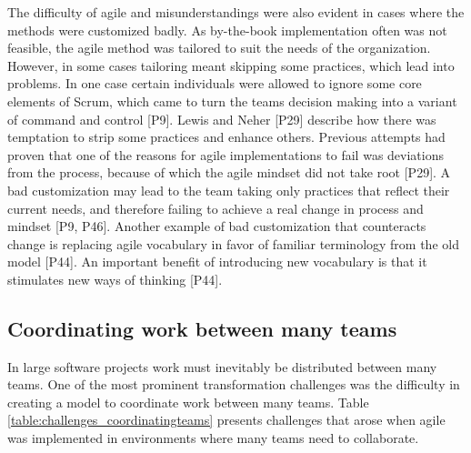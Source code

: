 

The difficulty of agile and misunderstandings were also evident in cases where
the methods were customized badly. As by-the-book implementation often was not
feasible, the agile method was tailored to suit the needs of the organization.
However, in some cases tailoring meant skipping some practices, which lead into
problems. In one case certain individuals were allowed to ignore some core
elements of Scrum, which came to turn the teams decision making into a variant
of command and control [P9].
Lewis and Neher [P29] describe how there was temptation to strip some practices
and enhance others. Previous attempts had proven that one of the reasons for
agile implementations to fail was deviations from the process, because of which
the agile mindset did not take root [P29]. A bad customization may lead to the
team taking only practices that reflect their current needs, and therefore
failing to achieve a real change in process and mindset [P9, P46].
Another example of bad customization that counteracts change is replacing agile
vocabulary in favor of familiar terminology from the old model [P44]. An
important benefit of introducing new vocabulary is that it stimulates new ways
of thinking [P44].


\subsection{Coordinating work between many teams}

In large software projects work must inevitably be distributed between many
teams. One of the most prominent transformation challenges was the difficulty in
creating a model to coordinate work between many teams. Table
\ref{table:challenges_coordinatingteams} presents challenges that arose when
agile was implemented in environments where many teams need to collaborate.


